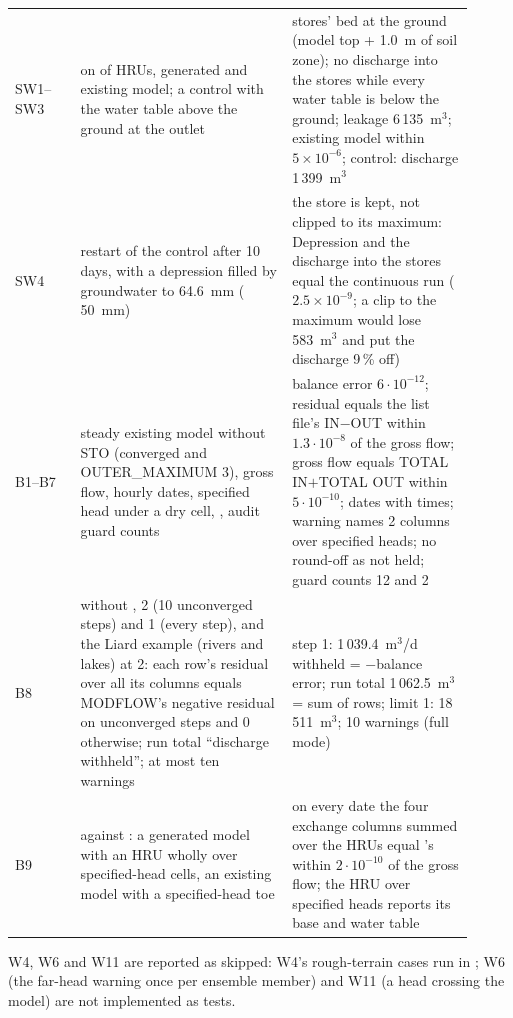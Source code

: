 \begin{longtable}{P{0.13\linewidth}P{0.42\linewidth}P{0.36\linewidth}}
SW1--SW3 &  on  of  HRUs, generated and existing model; a control with the water table above the ground at the outlet & stores' bed at the ground (model top + 1.0~m of soil zone); no discharge into the stores while every water table is below the ground; leakage 6\,135~m$^3$; existing model within $5\times10^{-6}$; control: discharge 1\,399~m$^3$\\
SW4 & restart of the control after 10 days, with a depression filled by groundwater to 64.6~mm ( 50~mm) & the store is kept, not clipped to its maximum: Depression and the discharge into the stores equal the continuous run ($2.5\times10^{-9}$; a clip to the maximum would lose 583~m$^3$ and put the discharge 9\,\% off)\\
B1--B7 & steady existing model without STO (converged and OUTER\_MAXIMUM 3), gross flow, hourly dates, specified head under a dry cell, , audit guard counts & balance error $6\cdot10^{-12}$; residual equals the list file's IN$-$OUT within $1.3\cdot10^{-8}$ of the gross flow; gross flow equals TOTAL IN$+$TOTAL OUT within $5\cdot10^{-10}$; dates with times; warning names 2 columns over specified heads; no round-off as not held; guard counts 12 and 2\\
B8 & without ,  2 (10 unconverged steps) and 1 (every step), and the Liard example (rivers and lakes) at 2: each row's residual over all its columns equals MODFLOW's negative residual on unconverged steps and 0 otherwise; run total ``discharge withheld''; at most ten warnings & step 1: 1\,039.4~m$^3$/d withheld = $-$balance error; run total 1\,062.5~m$^3$ = sum of rows; limit 1: 18\,511~m$^3$; 10 warnings (full mode)\\
B9 &  against : a generated model with an HRU wholly over specified-head cells, an existing model with a specified-head toe & on every date the four exchange columns summed over the HRUs equal 's within $2\cdot10^{-10}$ of the gross flow; the HRU over specified heads reports its base and water table\\\bottomrule
\end{longtable}
\noindent W4, W6 and W11 are reported as skipped: W4's rough-terrain cases run in ; W6 (the
far-head warning once per ensemble member) and W11 (a head crossing the model) are not implemented as tests.

